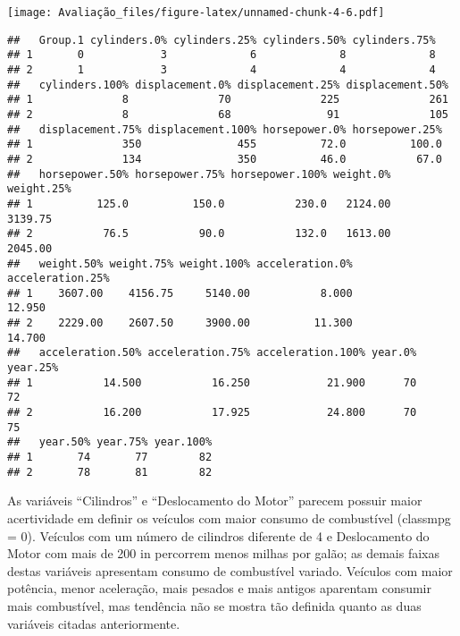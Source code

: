 \documentclass[]{article}
\newenvironment{Shaded}{\begin{snugshade}}{\end{snugshade}}
\newcommand{\KeywordTok}[1]{\textcolor[rgb]{0.13,0.29,0.53}{\textbf{#1}}}
\newcommand{\DecValTok}[1]{\textcolor[rgb]{0.00,0.00,0.81}{#1}}
\newcommand{\OperatorTok}[1]{\textcolor[rgb]{0.81,0.36,0.00}{\textbf{#1}}}
\newcommand{\NormalTok}[1]{#1}
\begin{document}
\texttt{[image: Avaliação\_files/figure-latex/unnamed-chunk-4-6.pdf]}

\begin{Shaded}
\end{Shaded}

\begin{verbatim}
##   Group.1 cylinders.0% cylinders.25% cylinders.50% cylinders.75%
## 1       0            3             6             8             8
## 2       1            3             4             4             4
##   cylinders.100% displacement.0% displacement.25% displacement.50%
## 1              8              70              225              261
## 2              8              68               91              105
##   displacement.75% displacement.100% horsepower.0% horsepower.25%
## 1              350               455          72.0          100.0
## 2              134               350          46.0           67.0
##   horsepower.50% horsepower.75% horsepower.100% weight.0% weight.25%
## 1          125.0          150.0           230.0   2124.00    3139.75
## 2           76.5           90.0           132.0   1613.00    2045.00
##   weight.50% weight.75% weight.100% acceleration.0% acceleration.25%
## 1    3607.00    4156.75     5140.00           8.000           12.950
## 2    2229.00    2607.50     3900.00          11.300           14.700
##   acceleration.50% acceleration.75% acceleration.100% year.0% year.25%
## 1           14.500           16.250            21.900      70       72
## 2           16.200           17.925            24.800      70       75
##   year.50% year.75% year.100%
## 1       74       77        82
## 2       78       81        82
\end{verbatim}

As variáveis ``Cilindros'' e ``Deslocamento do Motor'' parecem possuir
maior acertividade em definir os veículos com maior consumo de
combustível (classmpg = 0). Veículos com um número de cilindros
diferente de 4 e Deslocamento do Motor com mais de 200 in percorrem
menos milhas por galão; as demais faixas destas variáveis apresentam
consumo de combustível variado. Veículos com maior potência, menor
aceleração, mais pesados e mais antigos aparentam consumir mais
combustível, mas tendência não se mostra tão definida quanto as duas
variáveis citadas anteriormente.
\end{document}
